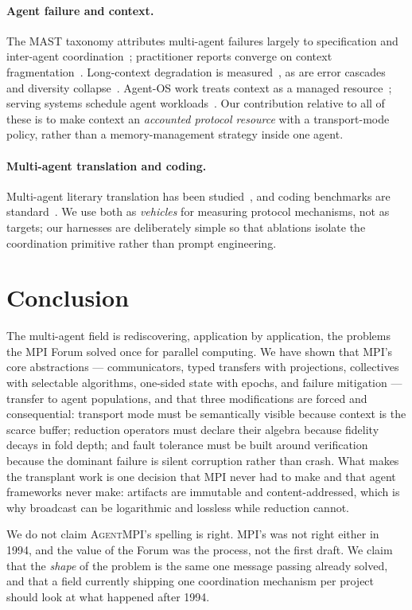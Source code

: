 \documentclass[10pt,twocolumn]{article}
\theoremstyle{definition}
\theoremstyle{plain}
\newcommand{\ampi}{\textsc{AgentMPI}}
\begin{document}
\paragraph{Agent failure and context.} The MAST taxonomy attributes multi-agent
failures largely to specification and inter-agent
coordination~\cite{mast,mastneurips}; practitioner reports converge on context
fragmentation~\cite{cognitiondont,anthropicmas,anthropicctxeng,lcbenchmark}.
Long-context degradation is
measured~\cite{liu24lostinmiddle,labanlost,chromarot}, as are error cascades and
diversity collapse~\cite{diversitycollapse}. Agent-OS work treats context as a
managed resource~\cite{memgpt,aios}; serving systems schedule agent
workloads~\cite{parrot,autellix,teola}. Our contribution relative to all of these is
to make context an \emph{accounted protocol resource} with a transport-mode policy,
rather than a memory-management strategy inside one agent.

\paragraph{Multi-agent translation and coding.} Multi-agent literary translation has
been studied~\cite{transagentstacl,transagentsdemo}, and coding benchmarks are
standard~\cite{jimenez24swebench}. We use both as \emph{vehicles} for measuring
protocol mechanisms, not as targets; our harnesses are deliberately simple so that
ablations isolate the coordination primitive rather than prompt engineering.

\section{Conclusion}

The multi-agent field is rediscovering, application by application, the problems the
MPI Forum solved once for parallel computing. We have shown that MPI's core
abstractions --- communicators, typed transfers with projections, collectives with
selectable algorithms, one-sided state with epochs, and failure mitigation ---
transfer to agent populations, and that three modifications are forced and
consequential: transport mode must be semantically visible because context is the
scarce buffer; reduction operators must declare their algebra because fidelity
decays in fold depth; and fault tolerance must be built around verification because
the dominant failure is silent corruption rather than crash. What makes the
transplant work is one decision that MPI never had to make and that agent frameworks
never make: artifacts are immutable and content-addressed, which is why broadcast can
be logarithmic and lossless while reduction cannot.

We do not claim \ampi{}'s spelling is right. MPI's was not right either in 1994, and
the value of the Forum was the process, not the first draft. We claim that the
\emph{shape} of the problem is the same one message passing already solved, and that
a field currently shipping one coordination mechanism per project should look at what
happened after 1994.

\balance


\end{document}
